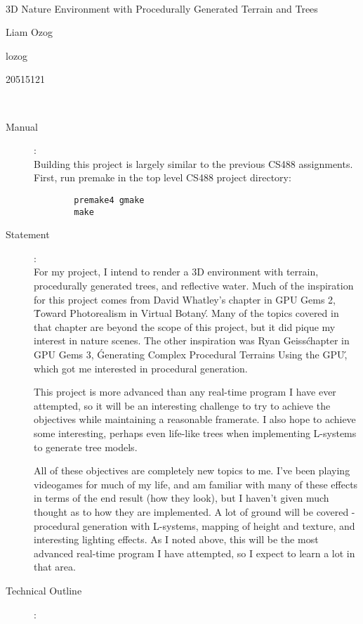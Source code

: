 \documentclass{article}
\newcommand\projecttitle{3D Nature Environment with Procedurally Generated Terrain and Trees}
\newcommand\myname{Liam Ozog}
\newcommand\myuserid{lozog}
\newcommand\mystudentid{20515121}
\begin{document}
~\vfill
\begin{center}
\Large

\projecttitle

\myname

\myuserid

\mystudentid

\end{center}
\vfill ~\vfill~
\newpage
{}
\begin{description}
\item[Manual]:\\
	Building this project is largely similar to the previous CS488 assignments. First, run premake in the top level CS488 project directory:
	\begin{verbatim}
		premake4 gmake
		make
	\end{verbatim}

\item[Statement]:\\

	For my project, I intend to render a 3D environment with terrain, procedurally generated trees, and reflective water. Much of the inspiration for this project comes from David Whatley's chapter in GPU Gems 2, \'Toward Photorealism in Virtual Botany\'. Many of the topics covered in that chapter are beyond the scope of this project, but it did pique my interest in nature scenes. The other inspiration was Ryan Geiss\' chapter in GPU Gems 3, \'Generating Complex Procedural Terrains Using the GPU\', which got me interested in procedural generation.

	This project is more advanced than any real-time program I have ever attempted, so it will be an interesting challenge to try to achieve the objectives while maintaining a reasonable framerate. I also hope to achieve some interesting, perhaps even life-like trees when implementing L-systems to generate tree models.

	All of these objectives are completely new topics to me. I've been playing videogames for much of my life, and am familiar with many of these effects in terms of the end result (how they look), but I haven't given much thought as to how they are implemented. A lot of ground will be covered - procedural generation with L-systems, mapping of height and texture, and interesting lighting effects. As I noted above, this will be the most advanced real-time program I have attempted, so I expect to learn a lot in that area.

\item[Technical Outline]:\\


\end{description}
\end{document}
